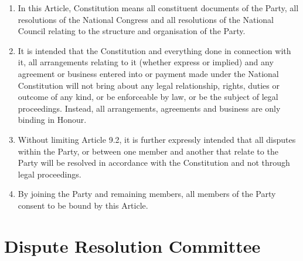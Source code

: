 \documentclass[a4paper,titlepage,8.5pt]{article}
\begin{document}
\begin{enumerate}
\item In this Article, Constitution means all constituent documents of the Party, all resolutions of the National Congress and all resolutions of the National Council relating to the structure and organisation of the Party.
\item It is intended that the Constitution and everything done in connection with it, all arrangements relating to it (whether express or implied) and any agreement or business entered into or payment made under the National Constitution will not bring about any legal relationship, rights, duties or outcome of any kind, or be enforceable by law, or be the subject of legal proceedings. Instead, all arrangements, agreements and business are only binding in Honour.
\item Without limiting Article 9.2, it is further expressly intended that all disputes within the Party, or between one member and another that relate to the Party will be resolved in accordance with the Constitution and not through legal proceedings.
\item By joining the Party and remaining members, all members of the Party consent to be bound by this Article.
\end{enumerate}

\section{Dispute Resolution Committee}
 
\end{document}
